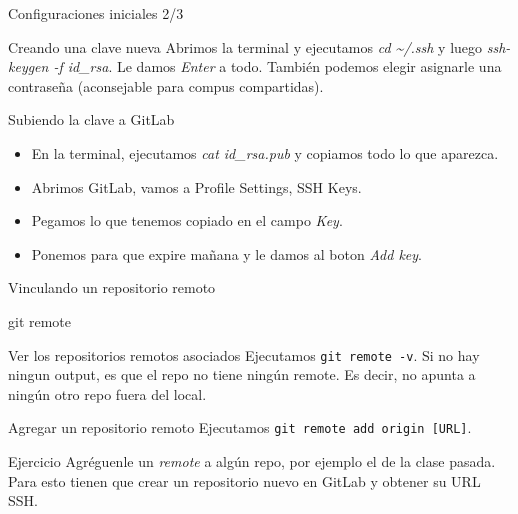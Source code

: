\begin{frame}{Configuraciones iniciales 2/3}
  \begin{block}{Creando una clave nueva}
		Abrimos la terminal y ejecutamos \textit{cd \textasciitilde/.ssh} y luego \textit{ssh-keygen -f id\_rsa}. Le damos \textit{Enter} a todo. También podemos elegir asignarle una contraseña (aconsejable para compus compartidas).
	\end{block}
  \pause
  \begin{block}{Subiendo la clave a GitLab}
		\begin{itemize}
		\item En la terminal, ejecutamos \textit{cat id\_rsa.pub} y copiamos todo lo que aparezca.
      \item Abrimos GitLab, vamos a Profile Settings, SSH Keys.
      \item Pegamos lo que tenemos copiado en el campo \textit{Key}.
      \item Ponemos para que expire mañana y le damos al boton \textit{Add key}.
		\end{itemize}
	\end{block}
\end{frame}

\begin{frame}[t]{Vinculando un repositorio remoto}
    \begin{comando}
        git remote
    \end{comando}

    \vspace{0.5em}
    \pause
    \begin{block}{Ver los repositorios remotos asociados}
        Ejecutamos \texttt{git remote -v}. Si no hay ningun output, es que el repo no tiene ningún remote. Es decir, no apunta a ningún otro repo fuera del local.
    \end{block}

    \pause
    \begin{block}{Agregar un repositorio remoto}
        Ejecutamos \texttt{git remote add origin [URL]}. %
    \end{block}

    \begin{ejercicio}{Ejercicio}
        Agréguenle un \textit{remote} a algún repo, por ejemplo el de la clase pasada. Para esto tienen que crear un repositorio nuevo en GitLab y obtener su URL SSH.
    \end{ejercicio}
\end{frame}

